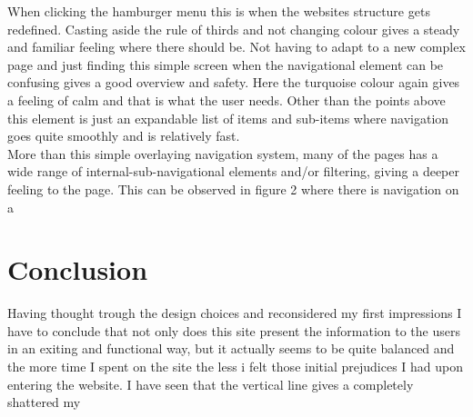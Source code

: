 \documentclass{article}
\begin{document}
        When clicking the hamburger menu this is when the websites structure gets redefined. Casting aside the rule of thirds and not changing colour gives a steady and familiar feeling where there should be. Not having to adapt to a new complex page and just finding this simple screen when the navigational element can be confusing gives a good overview and safety. Here the turquoise colour again gives a feeling of calm and that is what the user needs. Other than the points above this element is just an expandable list of items and sub-items where navigation goes quite smoothly and is relatively fast.\\
        More than this simple overlaying navigation system, many of the pages has a wide range of internal-sub-navigational elements and/or filtering, giving a deeper feeling to the page. This can be observed in figure 2 where there is navigation on a 
    \section{Conclusion}
    Having thought trough the design choices and reconsidered my first impressions I have to conclude that not only does this site present the information to the users in an exiting and functional way, but it actually seems to be quite balanced and the more time I spent on the site the less i felt those initial prejudices I had upon entering the website. I have seen that the vertical line gives a   completely shattered my 
   
    \printbibliography
        
    
\end{document}

